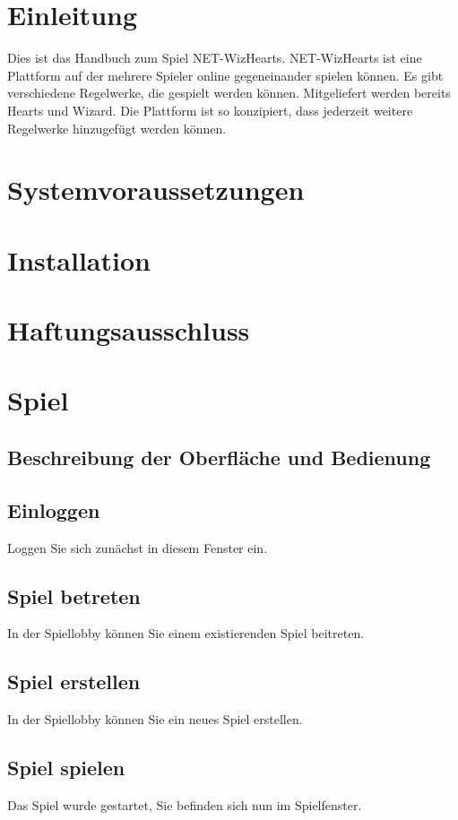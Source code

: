 \documentclass[titlepage,10pt,a4paper]{article}
\begin{document}
\newpage
 
\section{Einleitung}
Dies ist das Handbuch zum Spiel NET-WizHearts. NET-WizHearts ist eine Plattform auf der mehrere Spieler online gegeneinander spielen können. Es gibt verschiedene Regelwerke, die gespielt werden können. Mitgeliefert werden bereits Hearts und Wizard. Die Plattform ist so konzipiert, dass jederzeit weitere Regelwerke hinzugefügt werden können.

\section{Systemvoraussetzungen}

\section{Installation}

\section{Haftungsausschluss}

\section{Spiel}
\subsection{Beschreibung der Oberfläche und Bedienung}
\subsection{Einloggen}
Loggen Sie sich zunächst in diesem Fenster ein.
\subsection{Spiel betreten}
In der Spiellobby können Sie einem existierenden Spiel beitreten.
\subsection{Spiel erstellen}
In der Spiellobby können Sie ein neues Spiel erstellen.
\subsection{Spiel spielen}
Das Spiel wurde gestartet, Sie befinden sich nun im Spielfenster.
\end{document}
